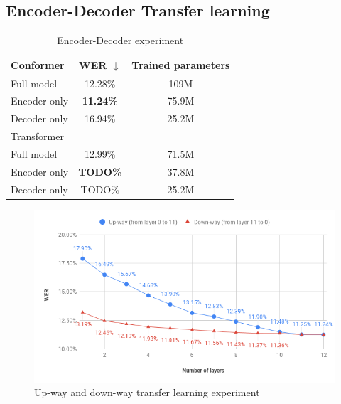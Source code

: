 \subsection{Encoder-Decoder Transfer learning}
\begin{table}
    \begin{center}
        \begin{tabular}{lcc}\hline
            Conformer    & WER $\downarrow$    & Trained parameters \\ \hline
            Full model          & 12.28\% & 109M   \\
            Encoder only & \textbf{11.24\%} & 75.9M  \\
            Decoder only & 16.94\% & 25.2M  \\ \hline \hline
            Transformer    &      &  \\ \hline
            Full model          & 12.99\% & 71.5M   \\
            Encoder only & \textbf{TODO\%} & 37.8M  \\
            Decoder only & TODO\% & 25.2M  \\ \hline 
        \end{tabular}
    \end{center}
    \caption{Encoder-Decoder experiment}
\end{table}
\begin{figure}
    \begin{center}
        \includegraphics[scale=0.7]{imgs/layerTL.png}
    \end{center}
    \caption{Up-way and down-way transfer learning experiment}
\end{figure}
